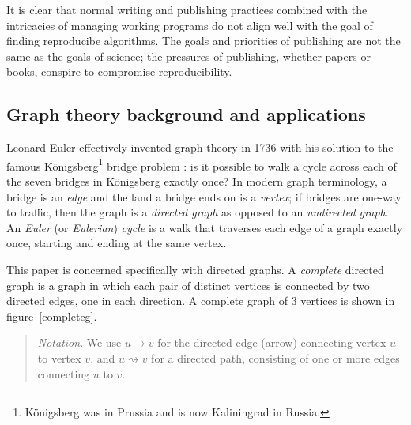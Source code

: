 \documentclass[preprint,times]{elsarticle}
\begin{document}
It is clear that normal writing and publishing practices combined with the intricacies of managing working programs do not align well with the goal of finding reproducibe algorithms. The goals and priorities of publishing are not the same as the goals of science; the pressures of publishing, whether papers or books, conspire to compromise reproducibility. 


\subsection{Graph theory background and applications}\label{graphtheory}

Leonard Euler effectively invented graph theory in 1736 with his solution to the famous K\"onigsberg\footnote{K\"onigsberg was in Prussia and is now Kaliningrad in Russia.} bridge problem \cite{euler,wilson}: is it possible to walk a cycle across each of the seven bridges in K\"onigsberg exactly once? In modern graph terminology, a bridge is an \emph{edge\/} and the land a bridge ends on is a \emph{vertex\/}; if bridges are one-way to traffic, then the graph is a \emph{directed graph\/} as opposed to an \emph{undirected graph\/}. An \emph{Euler\/} (or \emph{Eulerian\/}) \emph{cycle\/} is a walk that traverses each edge of a graph exactly once, starting and ending at the same vertex.%

This paper is concerned specifically with directed graphs. A \emph{complete\/} directed graph is a graph in which each pair of distinct vertices is connected by two directed edges, one in each direction. A complete graph of 3 vertices is shown in figure~\ref{completeg}. 

\begin{quote}\raggedright\emph{Notation}.
We use $u \rightarrow v$ for the directed edge (arrow) connecting vertex $u$ to vertex $v$, and $u \rightsquigarrow v$ for a directed path, consisting of one or more edges connecting $u$ to $v$. 

\end{quote}
\end{document}

